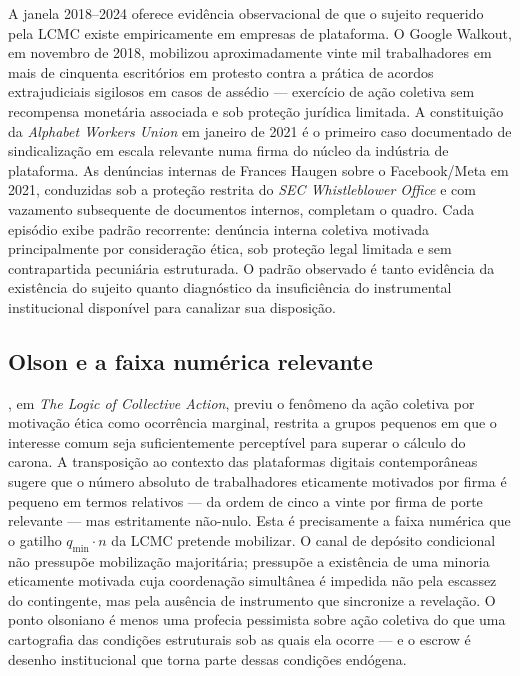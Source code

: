 \documentclass[12pt,a4paper]{article}
\begin{document}
A janela 2018--2024 oferece evidência observacional de que o sujeito requerido
pela LCMC existe empiricamente em empresas de plataforma. O Google Walkout, em
novembro de 2018, mobilizou aproximadamente vinte mil trabalhadores em mais de
cinquenta escritórios em protesto contra a prática de acordos extrajudiciais
sigilosos em casos de assédio --- exercício de ação coletiva sem recompensa
monetária associada e sob proteção jurídica limitada. A constituição da
\emph{Alphabet Workers Union} em janeiro de 2021 é o primeiro caso documentado
de sindicalização em escala relevante numa firma do núcleo da indústria de
plataforma. As denúncias internas de Frances Haugen sobre o Facebook/Meta em
2021, conduzidas sob a proteção restrita do \emph{SEC Whistleblower Office} e
com vazamento subsequente de documentos internos, completam o quadro. Cada
episódio exibe padrão recorrente: denúncia interna coletiva motivada
principalmente por consideração ética, sob proteção legal limitada e sem
contrapartida pecuniária estruturada. O padrão observado é tanto evidência da
existência do sujeito quanto diagnóstico da insuficiência do instrumental
institucional disponível para canalizar sua disposição.

\subsection{Olson e a faixa numérica relevante}

\citet{olson1965logic}, em \emph{The Logic of Collective Action}, previu o
fenômeno da ação coletiva por motivação ética como ocorrência marginal,
restrita a grupos pequenos em que o interesse comum seja suficientemente
perceptível para superar o cálculo do carona. A transposição ao contexto das
plataformas digitais contemporâneas sugere que o número absoluto de
trabalhadores eticamente motivados por firma é pequeno em termos relativos ---
da ordem de cinco a vinte por firma de porte relevante --- mas estritamente
não-nulo. Esta é precisamente a faixa numérica que o gatilho $q_{\min}\cdot n$
da LCMC pretende mobilizar. O canal de depósito condicional não pressupõe
mobilização majoritária; pressupõe a existência de uma minoria eticamente
motivada cuja coordenação simultânea é impedida não pela escassez do
contingente, mas pela ausência de instrumento que sincronize a revelação. O
ponto olsoniano é menos uma profecia pessimista sobre ação coletiva do que uma
cartografia das condições estruturais sob as quais ela ocorre --- e o escrow
é desenho institucional que torna parte dessas condições endógena.
\end{document}
